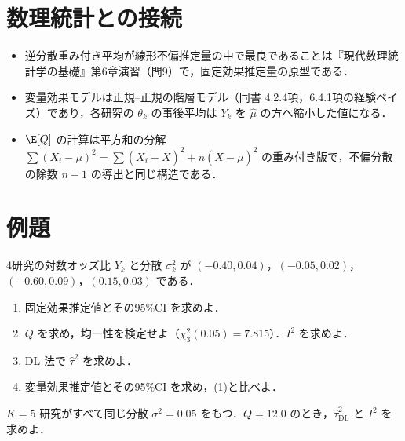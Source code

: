 \section{数理統計との接続}\label{sec:15-link}
\begin{linkbox}
\begin{itemize}
\item 逆分散重み付き平均が線形不偏推定量の中で最良であることは『現代数理統計学の基礎』第6章演習（問9）で，固定効果推定量の原型である．
\item 変量効果モデルは正規--正規の階層モデル（同書 4.2.4項，6.4.1項の経験ベイズ）であり，各研究の $\theta_k$ の事後平均は $Y_k$ を $\hat\mu$ の方へ縮小した値になる．
\item $\E[Q]$ の計算は平方和の分解 $\sum(X_i-\mu)^2=\sum(X_i-\bar X)^2+n(\bar X-\mu)^2$ の重み付き版で，不偏分散の除数 $n-1$ の導出と同じ構造である．
\end{itemize}
\end{linkbox}

\section{例題}\label{sec:15-ex}
\begin{reidai}[固定効果と変量効果]\label{reidai:15-1}
4研究の対数オッズ比 $Y_k$ と分散 $\sigma_k^2$ が $(-0.40,0.04)$，$(-0.05,0.02)$，$(-0.60,0.09)$，$(0.15,0.03)$ である．
\begin{enumerate}[label=(\arabic*)]
\item 固定効果推定値とその95\%CI を求めよ．
\item $Q$ を求め，均一性を検定せよ（$\chi^2_3(0.05)=7.815$）．$I^2$ を求めよ．
\item DL 法で $\hat\tau^2$ を求めよ．
\item 変量効果推定値とその95\%CI を求め，(1)と比べよ．
\end{enumerate}
\end{reidai}

\begin{reidai}[{$\E[Q]$ の応用}]\label{reidai:15-2}
$K=5$ 研究がすべて同じ分散 $\sigma^2=0.05$ をもつ．$Q=12.0$ のとき，$\hat\tau^2_{\mathrm{DL}}$ と $I^2$ を求めよ．
\end{reidai}

